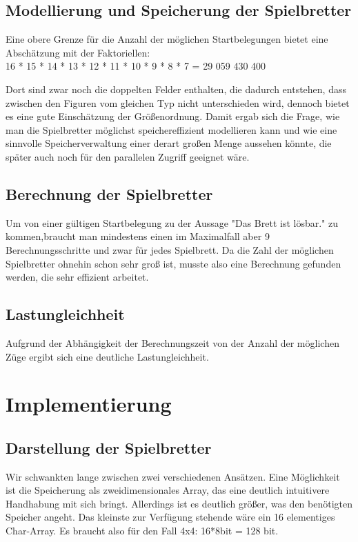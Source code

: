 \documentclass[
	12pt,
	a4paper,
	BCOR10mm,
	DIV14,
	listof=totoc,
	bibliography=totoc,
	headsepline
]{scrreprt}
\begin{document}
\subsection{Modellierung und Speicherung der Spielbretter}
Eine obere Grenze für die Anzahl der möglichen Startbelegungen bietet eine Abschätzung mit der Faktoriellen:\\
16 * 15 * 14 * 13 * 12 * 11 * 10 * 9 * 8 * 7 = 29 059 430 400

Dort sind zwar noch die doppelten Felder enthalten, die dadurch entstehen, dass zwischen den Figuren vom gleichen Typ nicht unterschieden wird, dennoch bietet es eine gute Einschätzung der Größenordnung.
Damit ergab sich die Frage, wie man die Spielbretter möglichst speichereffizient modellieren kann und wie eine sinnvolle Speicherverwaltung einer derart großen Menge aussehen könnte, die später auch noch für den parallelen Zugriff geeignet wäre.

\subsection{Berechnung der Spielbretter}
Um von einer gültigen Startbelegung zu der Aussage "Das Brett ist lösbar." zu kommen,braucht man mindestens einen im Maximalfall aber 9 Berechnungsschritte und zwar für jedes Spielbrett. Da die Zahl der möglichen Spielbretter ohnehin schon sehr groß ist, musste also eine Berechnung gefunden werden, die sehr effizient arbeitet.


\subsection{Lastungleichheit}
Aufgrund der Abhängigkeit der Berechnungszeit von der Anzahl der möglichen Züge ergibt sich eine deutliche Lastungleichheit.



\section{Implementierung}
\subsection{Darstellung der Spielbretter}
Wir schwankten lange zwischen zwei verschiedenen Ansätzen.
Eine Möglichkeit ist die Speicherung als zweidimensionales Array, das eine deutlich intuitivere Handhabung mit sich bringt. Allerdings ist es deutlich größer, was den benötigten Speicher angeht.
Das kleinste zur Verfügung stehende wäre ein 16 elementiges Char-Array. 
Es braucht also für den Fall 4x4:  16*8bit = 128 bit.
\end{document}
